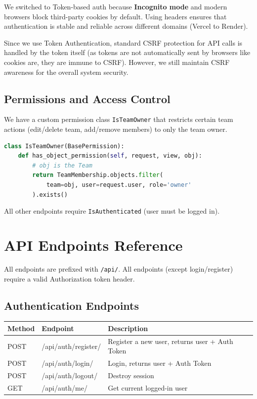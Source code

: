 \documentclass[12pt,a4paper]{article}
\begin{document}
\begin{notebox}
We switched to Token-based auth because \textbf{Incognito mode} and modern browsers block third-party cookies by default. Using headers ensures that authentication is stable and reliable across different domains (Vercel to Render).
\end{notebox}

Since we use Token Authentication, standard CSRF protection for API calls is handled by the token itself (as tokens are not automatically sent by browsers like cookies are, they are immune to CSRF). However, we still maintain CSRF awareness for the overall system security.

\subsection{Permissions and Access Control}

We have a custom permission class \texttt{IsTeamOwner} that restricts certain team actions (edit/delete team, add/remove members) to only the team owner.

\begin{lstlisting}[language=Python]
class IsTeamOwner(BasePermission):
    def has_object_permission(self, request, view, obj):
        # obj is the Team
        return TeamMembership.objects.filter(
            team=obj, user=request.user, role='owner'
        ).exists()
\end{lstlisting}

All other endpoints require \texttt{IsAuthenticated} (user must be logged in).


\section{API Endpoints Reference}

All endpoints are prefixed with \texttt{/api/}. All endpoints (except login/register) require a valid Authorization token header.

\subsection{Authentication Endpoints}
\begin{center}
\begin{tabularx}{\textwidth}{llX}
\toprule
\textbf{Method} & \textbf{Endpoint} & \textbf{Description} \\
\midrule
POST & /api/auth/register/ & Register a new user, returns user + Auth Token \\
POST & /api/auth/login/ & Login, returns user + Auth Token \\
POST & /api/auth/logout/ & Destroy session \\
GET & /api/auth/me/ & Get current logged-in user \\
\bottomrule
\end{tabularx}
\end{center}
\end{document}
